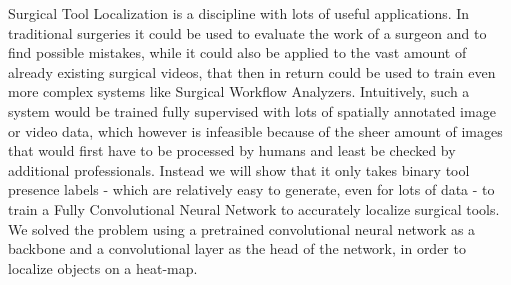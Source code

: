 Surgical Tool Localization is a discipline with lots of useful applications. In traditional surgeries it could be used to evaluate the work of a surgeon and to find possible mistakes, while it could also be applied to the vast amount of already existing surgical videos, that then in return could be used to train even more complex systems like Surgical Workflow Analyzers. Intuitively, such a system would be trained fully supervised with lots of spatially annotated image or video data, which however is infeasible because of the sheer amount of images that would first have to be processed by humans and least be checked by additional professionals. Instead we will show that it only takes binary tool presence labels - which are relatively easy to generate, even for lots of data - to train a Fully Convolutional Neural Network to accurately localize surgical tools. We solved the problem using a pretrained convolutional neural network as a backbone and a convolutional layer as the head of the network, in order to localize objects on a heat-map.